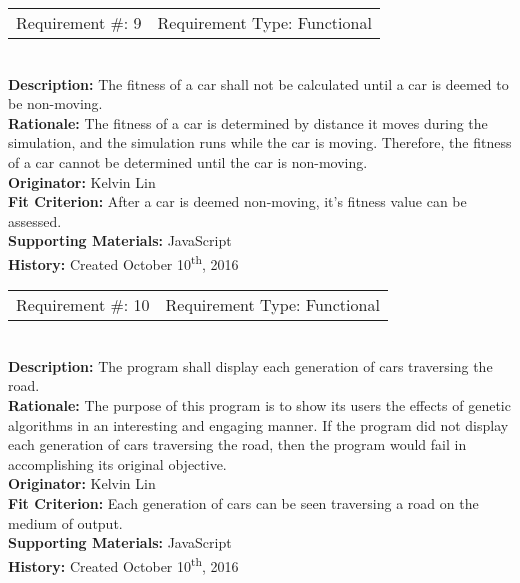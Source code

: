 \documentclass[12pt, titlepage]{article}
\begin{document}
\begin{reqbox}
%
\begin{tabular}{cc}
Requirement \#: 9 & Requirement Type: Functional \\
\end{tabular} \\
%
\textbf{Description:} The fitness of a car shall not be calculated until a car 
is deemed to be non-moving. \\
\textbf{Rationale:} The fitness of a car is determined by distance it moves 
during the simulation, and the simulation runs while the car is moving. 
Therefore, the fitness of a car cannot be determined until the car is 
non-moving. \\
\textbf{Originator:} Kelvin Lin\\
\textbf{Fit Criterion:} After a car is deemed non-moving, it's fitness value can 
be assessed.\\
%  
\textbf{Supporting Materials:} JavaScript \\
\textbf{History:} Created October 10\textsuperscript{th}, 2016
%
\end{reqbox}

\newpage

\begin{reqbox}
%
\begin{tabular}{cc}
Requirement \#: 10 & Requirement Type: Functional \\
\end{tabular} \\
%
\textbf{Description:} The program shall display each generation of cars 
traversing the road. \\
\textbf{Rationale:} The purpose of this program is to show its users the effects 
of genetic algorithms in an interesting and engaging manner. If the program did 
not display each generation of cars traversing the road, then the program would 
fail in accomplishing its original objective. \\
\textbf{Originator:} Kelvin Lin\\
\textbf{Fit Criterion:} Each generation of cars can be seen traversing a road on 
the medium of output.\\
%  
\textbf{Supporting Materials:} JavaScript \\
\textbf{History:} Created October 10\textsuperscript{th}, 2016
%
\end{reqbox}
\end{document}
